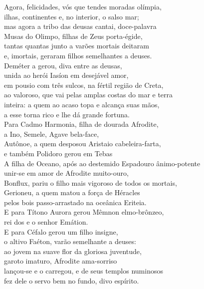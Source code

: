 \begin{pages}
\begin{Rightside}
Agora, felicidades, vós que tendes moradas olímpia,\\
ilhas, continentes e, no interior, o salso mar;\\
mas agora a tribo das deusas cantai, doce-palavra \\
Musas do Olimpo, filhas de Zeus porta-égide,\\
tantas quantas junto a varões mortais deitaram\\
e, imortais, geraram filhos semelhantes a deuses.\\

\quad{}Deméter a  gerou, diva entre as deusas,\\
unida ao herói Iasíon em desejável amor, \\
em pousio com três sulcos, na fértil região de Creta,\\
ao valoroso, que vai pelas amplas costas do mar e terra\\
inteira: a quem ao acaso topa e alcança suas mãos,\\
a esse torna rico e lhe dá grande fortuna.\\

\quad{}Para Cadmo Harmonia, filha de dourada Afrodite, \\
a Ino, Semele, Agave bela-face,\\
Autônoe, a quem desposou Aristaio cabeleira-farta,\\
e também Polidoro gerou em Tebas \\

\quad{}A filha de Oceano, após ao destemido Espadouro \qb{}ânimo-potente\\
unir-se em amor de Afrodite muito-ouro, \\
Bonflux, pariu o filho mais vigoroso de todos os mortais,\\
Gerioneu, a quem matou a força de Héracles\\
pelos bois passo-arrastado na oceânica Eriteia.\\

\quad{}E para Títono Aurora gerou Mêmnon elmo-brônzeo,\\
rei dos  e o senhor Emátion. \\
E para Céfalo gerou um filho insigne,\\
o altivo Faéton, varão semelhante a deuses:\\
ao jovem na suave flor da gloriosa juventude,\\
garoto imaturo, Afrodite ama-sorriso\\
lançou-se e o carregou, e de seus templos numinosos \\
fez dele o servo bem no fundo, divo espírito.\\


\end{Rightside}
\end{pages}
